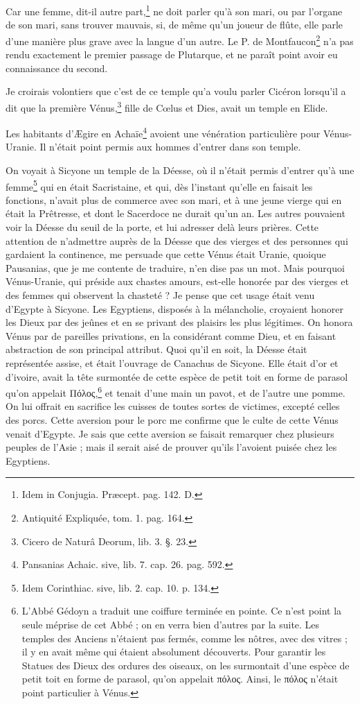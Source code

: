 \documentclass[a4paper, 11pt, oneside, polutonikogreek, french]{article}
\begin{document}
Car une femme, dit-il autre part,\footnote{Idem in Conjugia. Præcept. pag. 142. D.} ne doit parler qu'à son mari, ou par l'organe de son mari, sans trouver mauvais, si, de même qu'un joueur de flûte, elle parle d'une manière plus grave avec la langue d'un autre. Le P. de Montfaucon\footnote{Antiquité Expliquée, tom. 1. pag. 164.} n'a pas rendu exactement le premier passage de Plutarque, et ne paraît point avoir eu connaissance du second.

Je croirais volontiers que c'est de ce temple qu'a voulu parler Cicéron lorsqu'il a dit que la première Vénus,\footnote{Cicero de Naturâ Deorum, lib. 3. §. 23.} fille de Cœlus et Dies, avait un temple en Elide.

Les habitants d'Ægire en Achaïe\footnote{Pansanias Achaic. sive, lib. 7. cap. 26. pag. 592.} avoient une vénération particulière pour Vénus-Uranie. Il n'était point permis aux hommes d'entrer dans son temple.

On voyait à Sicyone un temple de la Déesse, où il n'était permis d'entrer qu'à une femme\footnote{Idem Corinthiac. sive, lib. 2. cap. 10. p. 134.} qui en était Sacristaine, et qui, dès l'instant qu'elle en faisait les fonctions, n'avait plus de commerce avec son mari, et à une jeune vierge qui en était la Prêtresse, et dont le Sacerdoce ne durait qu'un an. Les autres pouvaient voir la Déesse du seuil de la porte, et lui adresser delà leurs prières. Cette attention de n'admettre auprès de la Déesse que des vierges et des personnes qui gardaient la continence, me persuade que cette Vénus était Uranie, quoique Pausanias, que je me contente de traduire, n'en dise pas un mot. Mais pourquoi Vénus-Uranie, qui préside aux chastes amours, est-elle honorée par des vierges et des femmes qui observent la chasteté ? Je pense que cet usage était venu d'Egypte à Sicyone. Les Egyptiens, disposés à la mélancholie, croyaient honorer les Dieux par des jeûnes et en se privant des plaisirs les plus légitimes. On honora Vénus par de pareilles privations, en la considérant comme Dieu, et en faisant abstraction de son principal attribut. Quoi qu'il en soit, la Déesse était représentée assise, et était l'ouvrage de Canachus de Sicyone. Elle était d'or et d'ivoire, avait la tête surmontée de cette espèce de petit toit en forme de parasol qu'on appelait Πόλος,\footnote{L'Abbé Gédoyn a traduit une coiffure terminée en pointe. Ce n'est point la seule méprise de cet Abbé ; on en verra bien d'autres par la suite. Les temples des Anciens n'étaient pas fermés, comme les nôtres, avec des vitres ; il y en avait même qui étaient absolument découverts. Pour garantir les Statues des Dieux des ordures des oiseaux, on les surmontait d'une espèce de petit toit en forme de parasol, qu'on appelait πόλος. Ainsi, le πόλος n'était point particulier à Vénus.} et tenait d'une main un pavot, et de l'autre une pomme. On lui offrait en sacrifice les cuisses de toutes sortes de victimes, excepté celles des porcs. Cette aversion pour le porc me confirme que le culte de cette Vénus venait d'Egypte. Je sais que cette aversion se faisait remarquer chez plusieurs peuples de l'Asie ; mais il serait aisé de prouver qu'ils l'avoient puisée chez les Egyptiens.
\end{document}

